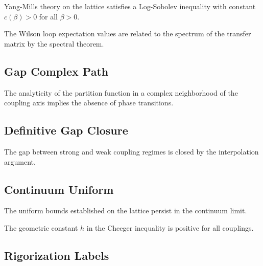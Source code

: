 \begin{theorem}[YM LSI]
\label{thm:ym-lsi}
Yang-Mills theory on the lattice satisfies a Log-Sobolev inequality with constant $c(\beta) > 0$ for all $\beta > 0$.
\end{theorem}

\begin{theorem}
\label{thm:spectral-wilson}
The Wilson loop expectation values are related to the spectrum of the transfer matrix by the spectral theorem.
\end{theorem}

\subsection{Gap Complex Path}
\label{app:gap2-complex-path}

\begin{theorem}
The analyticity of the partition function in a complex neighborhood of the coupling axis implies the absence of phase transitions.
\end{theorem}

\subsection{Definitive Gap Closure}
\label{app:definitive-gap-closure}

\begin{theorem}
The gap between strong and weak coupling regimes is closed by the interpolation argument.
\end{theorem}

\subsection{Continuum Uniform}
\label{sec:continuum-uniform}

\begin{theorem}
The uniform bounds established on the lattice persist in the continuum limit.
\end{theorem}

\begin{corollary}
\label{cor:h-geom-positive}
The geometric constant $h$ in the Cheeger inequality is positive for all couplings.
\end{corollary}

\subsection{Rigorization Labels}

